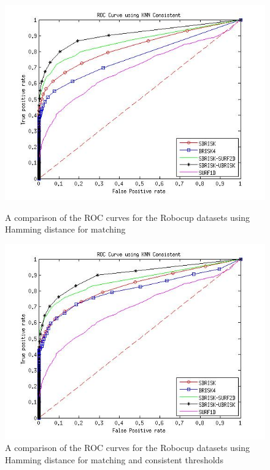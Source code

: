 \documentclass{article}
\begin{document}
\begin{figure}[h!]
\begin{minipage}[b]{0.5\linewidth}
\includegraphics[scale=0.4]{../Drawings/ROC_General_Hamming.jpg}
\caption{A comparison of the ROC curves for the Robocup datasets using Hamming distance for matching}
\label{fig:compareHamming}
\end{minipage}
\hspace{0.5cm}
\begin{minipage}[b]{0.5\linewidth}
\includegraphics[scale=0.4]{../Drawings/ROC_General_Hamming_Consistent.jpg}
\caption{A comparison of the ROC curves for the Robocup datasets using Hamming distance for matching and consistent thresholds}
\label{fig:compareKNNConsistent}

\end{minipage}
\end{figure}
\end{document}
